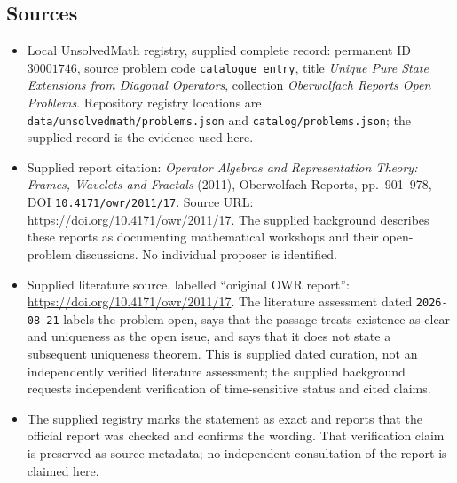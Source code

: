 \documentclass[11pt]{article}
\begin{document}
\subsection{Sources}
\begin{itemize}
\item Local UnsolvedMath registry, supplied complete record: permanent ID \(30001746\), source problem code \texttt{catalogue entry}, title \emph{Unique Pure State Extensions from Diagonal Operators}, collection \emph{Oberwolfach Reports Open Problems}. Repository registry locations are \texttt{data/unsolvedmath/problems.json} and \texttt{catalog/problems.json}; the supplied record is the evidence used here.
\item Supplied report citation: \emph{Operator Algebras and Representation Theory: Frames, Wavelets and Fractals} (2011), Oberwolfach Reports, pp.\ 901--978, DOI \texttt{10.4171/owr/2011/17}. Source URL: \url{https://doi.org/10.4171/owr/2011/17}. The supplied background describes these reports as documenting mathematical workshops and their open-problem discussions. No individual proposer is identified.
\item Supplied literature source, labelled ``original OWR report'': \url{https://doi.org/10.4171/owr/2011/17}. The literature assessment dated \texttt{2026-08-21} labels the problem open, says that the passage treats existence as clear and uniqueness as the open issue, and says that it does not state a subsequent uniqueness theorem. This is supplied dated curation, not an independently verified literature assessment; the supplied background requests independent verification of time-sensitive status and cited claims.
\item The supplied registry marks the statement as exact and reports that the official report was checked and confirms the wording. That verification claim is preserved as source metadata; no independent consultation of the report is claimed here.
\end{itemize}
\end{document}
